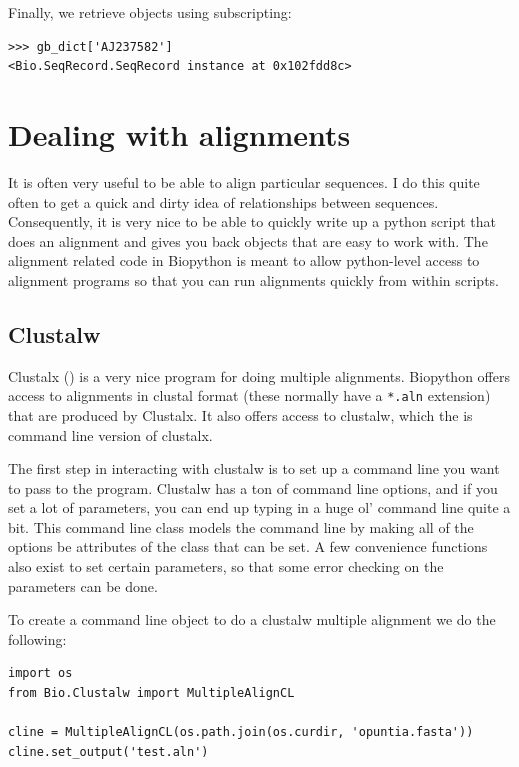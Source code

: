 \documentclass{report}
\begin{document}
Finally, we retrieve objects using subscripting:

\begin{verbatim}
>>> gb_dict['AJ237582']
<Bio.SeqRecord.SeqRecord instance at 0x102fdd8c>
\end{verbatim}

\section{Dealing with alignments}

It is often very useful to be able to align particular sequences. I do this quite often to get a quick and dirty idea of relationships between sequences. Consequently, it is very nice to be able to quickly write up a python script that does an alignment and gives you back objects that are easy to work with. The alignment related code in Biopython is meant to allow python-level access to alignment programs so that you can run alignments quickly from within scripts.

\subsection{Clustalw}
\label{sec:align_clustal}

Clustalx () is a very nice program for doing multiple alignments. Biopython offers access to alignments in clustal format (these normally have a \verb|*.aln| extension) that are produced by Clustalx. It also offers access to clustalw, which the is command line version of clustalx.


The first step in interacting with clustalw is to set up a command line you want to pass to the program. Clustalw has a ton of command line options, and if you set a lot of parameters, you can end up typing in a huge ol' command line quite a bit. This command line class models the command line by making all of the options be attributes of the class that can be set. A few convenience functions also exist to set certain parameters, so that some error checking on the parameters can be done.


To create a command line object to do a clustalw multiple alignment we do the following:

\begin{verbatim}
import os
from Bio.Clustalw import MultipleAlignCL

cline = MultipleAlignCL(os.path.join(os.curdir, 'opuntia.fasta'))
cline.set_output('test.aln')
\end{verbatim}
\end{document}
